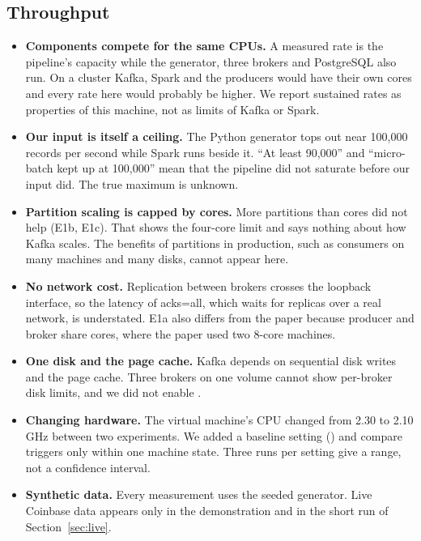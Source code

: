 \subsection{Throughput}
\begin{itemize}
  \item \textbf{Components compete for the same CPUs.} A measured rate is the pipeline's capacity while the
        generator, three brokers and PostgreSQL also run. On a cluster Kafka, Spark and the producers would
        have their own cores and every rate here would probably be higher. We report sustained rates as
        properties of this machine, not as limits of Kafka or Spark.
  \item \textbf{Our input is itself a ceiling.} The Python generator tops out near 100,000 records per second
        while Spark runs beside it. ``At least 90,000'' and ``micro-batch kept up at 100,000'' mean that the
        pipeline did not saturate before our input did. The true maximum is unknown.
  \item \textbf{Partition scaling is capped by cores.} More partitions than cores did not help (E1b, E1c). That
        shows the four-core limit and says nothing about how Kafka scales. The benefits of partitions in
        production, such as consumers on many machines and many disks, cannot appear here.
  \item \textbf{No network cost.} Replication between brokers crosses the loopback interface, so the latency of
        acks=all, which waits for replicas over a real network, is understated. E1a also differs from the
        paper because producer and broker share cores, where the paper used two 8-core machines.
  \item \textbf{One disk and the page cache.} Kafka depends on sequential disk writes and the page cache.
        Three brokers on one volume cannot show per-broker disk limits, and we did not enable .
  \item \textbf{Changing hardware.} The virtual machine's CPU changed from 2.30 to 2.10 GHz between two
        experiments. We added a baseline setting () and compare triggers only within one machine
        state. Three runs per setting give a range, not a confidence interval.
  \item \textbf{Synthetic data.} Every measurement uses the seeded generator. Live Coinbase data appears only
        in the demonstration and in the short run of Section~\ref{sec:live}.
\end{itemize}

